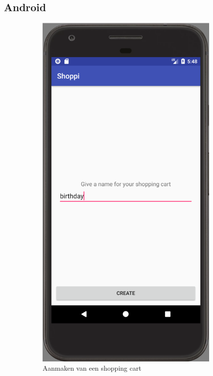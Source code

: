 \subsection{Android}
\begin{figure}[H]
	\centering
	\begin{subfigure}{.5\textwidth}
		\centering
		\includegraphics[width=0.65\linewidth]{img/poc/android/1.png}
		\caption{Aanmaken van een shopping cart}
	\end{subfigure}%
	\begin{subfigure}{.5\textwidth}
		\centering

\end{subfigure}
\end{figure}
